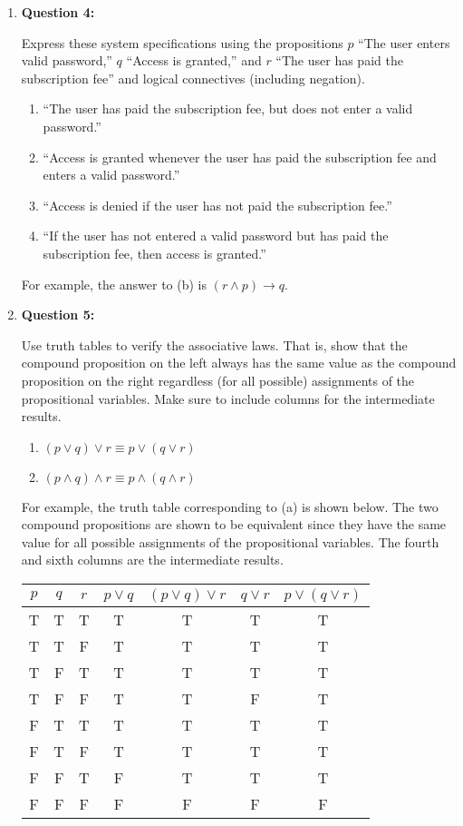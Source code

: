 \documentclass[11pt]{article}
\begin{document}
\begin{enumerate}
\item
\textbf{Question 4:}

Express these system specifications using the propositions $p$ ``The user enters valid password,'' $q$ ``Access is granted,'' and $r$ ``The user has paid the subscription fee'' and logical connectives (including negation).

\begin{enumerate}[label=(\alph*)]
\item ``The user has paid the subscription fee, but does not enter a valid password.''
\item ``Access is granted whenever the user has paid the subscription fee and enters a valid password.''
\item ``Access is denied if the user has not paid the subscription fee.''
\item ``If the user has not entered a valid password but has paid the subscription fee, then access is granted.''
\end{enumerate}

For example, the answer to (b) is $(r \land p) \rightarrow q$.

\item
\textbf{Question 5:}

Use truth tables to verify the associative laws. That is, show that the compound proposition on the left always has the same value as the compound proposition on the right regardless (for all possible) assignments of the propositional variables. Make sure to include columns for the intermediate results.

\begin{enumerate}[label=(\alph*)]
\item $(p \lor q) \lor r \equiv p \lor (q \lor r)$
\item $(p \land q) \land r \equiv p \land (q \land r)$
\end{enumerate}

For example, the truth table corresponding to (a) is shown below. The two compound propositions are shown to be equivalent since they have the same value for all possible assignments of the propositional variables. The fourth and sixth columns are the intermediate results.

\begin{center}
\begin{tabular}{|c|c|c|c|c|c|c|}
\hline
$p$ & $q$ & $r$ & $p \lor q$ & $(p \lor q) \lor r$ & $q \lor r$ & $p \lor (q \lor r)$\\
\hline
T & T & T & T & T & T & T\\
T & T & F & T & T & T & T\\
T & F & T & T & T & T & T\\
T & F & F & T & T & F & T\\
F & T & T & T & T & T & T\\
F & T & F & T & T & T & T\\
F & F & T & F & T & T & T\\
F & F & F & F & F & F & F\\
\hline
\end{tabular}
\end{center}


\end{enumerate}
\end{document}
